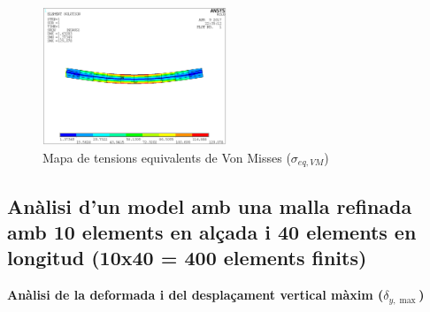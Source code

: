 \documentclass[a4paper]{article}
\def\imgS{0.49\textwidth}
\begin{document}
\begin{figure}[H]
	\centering
	\includegraphics[width=\imgS]{images/40_von_misses}
	\caption{Mapa de tensions equivalents de Von Misses ($\sigma_{eq,VM}$)}
	\label{fig:40_von_misses}
\end{figure}

\subsection{Anàlisi d'un model amb una malla refinada amb 10 elements en alçada i 40 elements en longitud (10x40 = 400 elements finits)}
\textbf{Anàlisi de la deformada i del desplaçament vertical màxim ($\delta_{y, \max}$)}
\end{document}
